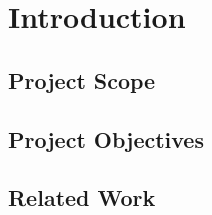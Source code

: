 
\chapter{Introduction}
\label{chapter:intro}

\section{Project Scope}
\label{sec:intro:scope}

\section{Project Objectives}
\label{sec:intro:objectives}

\section{Related Work}
\label{sec:intro:related}
